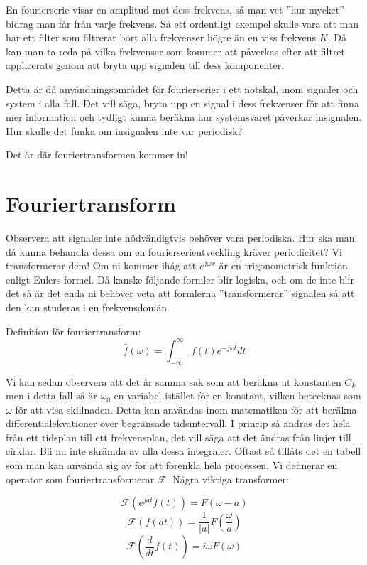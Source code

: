 \documentclass{article}
\begin{document}
En fourierserie visar en amplitud mot dess frekvens, så man vet
''hur mycket'' bidrag man får från varje frekvens.
Så ett ordentligt exempel skulle vara att man har ett filter som
filtrerar bort alla frekvenser högre än en viss frekvens $K$.
Då kan man ta reda på vilka frekvenser som kommer att påverkas
efter att filtret applicerats genom att bryta upp signalen till dess komponenter.

Detta är då användningsområdet för fourierserier i ett nötskal,
inom signaler och system i alla fall.
Det vill säga, bryta upp en signal i dess frekvenser för att finna mer
information och tydligt kunna beräkna hur systemsvaret påverkar insignalen.
Hur skulle det funka om insignalen inte var periodisk?

Det är där fouriertransformen kommer in!

\section{Fouriertransform}

Observera att signaler inte nödvändigtvis behöver vara periodiska.
Hur ska man då kunna behandla dessa om en fourierserieutveckling kräver
periodicitet? Vi transformerar dem! Om ni kommer ihåg att
$e^{j\omega x}$ är en trigonometrisk funktion enligt Eulers formel.
Då kanske följande formler blir logiska, och om de inte blir det så är det
enda ni behöver veta att formlerna ''transformerar'' signalen så att den kan
studeras i en frekvensdomän.

Definition för fouriertransform:
\begin{displaymath}
  \hat{f}(\omega) = \int_{-\infty}^{\infty} f(t) e^{-j \omega t} dt
\end{displaymath}

Vi kan sedan observera att det är samma sak som att beräkna ut konstanten $C_k$
men i detta fall så är $\omega_0$ en variabel istället för en konstant,
vilken betecknas som $\omega$ för att visa skillnaden.
Detta kan användas inom matematiken för att beräkna differentialekvationer
över begränsade tidsintervall. I princip så ändras det hela från ett tidsplan
till ett frekvensplan, det vill säga att det ändras från linjer till cirklar.
Bli nu inte skrämda av alla dessa integraler.
Oftast så tillåts det en tabell som man kan använda sig av för att förenkla
hela processen. Vi definerar en operator som fouriertransformerar $\mathcal{F}$.
Några viktiga transformer:

\begin{displaymath}
  \mathcal{F}(e^{j a t} f(t)) = F(\omega - a) %
\end{displaymath}
\begin{displaymath}
  \mathcal{F}(f(at)) = \frac{1}{|a|}F(\frac{\omega}{a}) %
\end{displaymath}
\begin{displaymath}
  \mathcal{F}(\frac{d}{dt} f(t)) = i\omega F(\omega) %
\end{displaymath}
\end{document}
